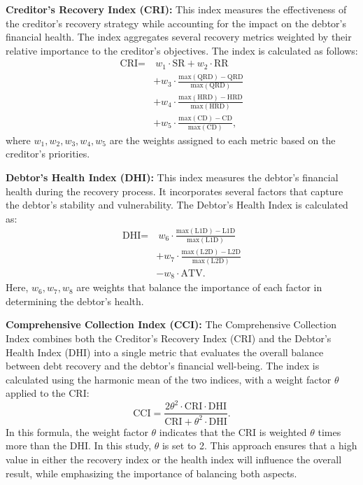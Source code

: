 \textbf{Creditor’s Recovery Index (CRI):} This index measures the effectiveness of the creditor's recovery strategy while accounting for the impact on the debtor’s financial health. The index aggregates several recovery metrics weighted by their relative importance to the creditor's objectives. The index is calculated as follows:
\begin{equation}
\begin{split}
\text{CRI} = &\ w_1 \cdot \text{SR} + w_2 \cdot \text{RR} \\
& + w_3 \cdot \frac{\text{max}(\text{QRD}) - \text{QRD}}{\text{max}(\text{QRD})} \\
& + w_4 \cdot \frac{\text{max}(\text{HRD}) - \text{HRD}}{\text{max}(\text{HRD})} \\
& + w_5 \cdot \frac{\text{max}(\text{CD}) - \text{CD}}{\text{max}(\text{CD})},
\end{split}
\end{equation}
where \(w_1, w_2, w_3, w_4, w_5\) are the weights assigned to each metric based on the creditor’s priorities.

\textbf{Debtor’s Health Index (DHI):} This index measures the debtor's financial health during the recovery process. It incorporates several factors that capture the debtor's stability and vulnerability. The Debtor’s Health Index is calculated as:
\begin{equation}
\begin{split}
\text{DHI} = &\ w_6 \cdot \frac{\text{max}(\text{L1D}) - \text{L1D}}{\text{max}(\text{L1D})} \\
& + w_7 \cdot \frac{\text{max}(\text{L2D}) - \text{L2D}}{\text{max}(\text{L2D})} \\
& - w_8 \cdot \text{ATV}.
\end{split}
\end{equation}
Here, \(w_6, w_7, w_8\) are weights that balance the importance of each factor in determining the debtor’s health.

\textbf{Comprehensive Collection Index (CCI):} The Comprehensive Collection Index combines both the Creditor’s Recovery Index (CRI) and the Debtor’s Health Index (DHI) into a single metric that evaluates the overall balance between debt recovery and the debtor’s financial well-being. The index is calculated using the harmonic mean of the two indices, with a weight factor $\theta$ applied to the CRI:
\begin{equation}
\text{CCI} = \frac{2 \theta^2 \cdot \text{CRI} \cdot \text{DHI}}{\text{CRI} + \theta^2\cdot\text{DHI}}.
\end{equation}
In this formula, the weight factor $\theta$ indicates that the CRI is weighted $\theta$ times more than the DHI. In this study, $\theta$ is set to 2. This approach ensures that a high value in either the recovery index or the health index will influence the overall result, while emphasizing the importance of balancing both aspects.


